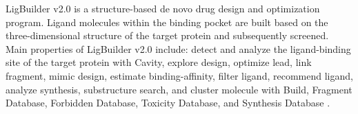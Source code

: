     LigBuilder v2.0 is a structure-based de novo drug design and optimization program. Ligand molecules within the binding pocket are built based on the three-dimensional structure of the target protein and subsequently screened. Main properties of LigBuilder v2.0 include: detect and analyze the ligand-binding site of the target protein with Cavity, explore design, optimize lead, link fragment, mimic design, estimate binding-affinity, filter ligand, recommend ligand, analyze synthesis, substructure search,  and cluster molecule with Build, Fragment Database, Forbidden Database, Toxicity Database, and Synthesis Database \cite{Wang_2000}\cite{Yuan_2011}.